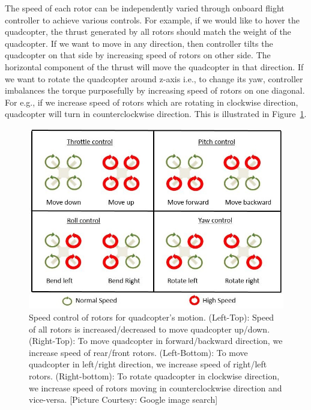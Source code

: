 The speed of each rotor can be independently varied through onboard flight
controller to achieve various controls. For example, if we would like to hover
the quadcopter, the thrust generated by all rotors should match the weight of the
quadcopter. If we want to move in any direction, then controller tilts the
quadcopter on that side by increasing speed of rotors on other side. The
horizontal component of the thrust will move the quadcopter in that direction.
If we want to rotate the quadcopter around z-axis i.e., to change its yaw,
controller imbalances the torque purposefully by increasing speed of rotors on
one diagonal. For e.g., if we increase speed of rotors which are rotating in
clockwise direction, quadcopter will turn in counterclockwise direction.
This is illustrated in Figure~\ref{fig:quadcopterMotion}.

\begin{figure}[h!]
  \includegraphics[width=\textwidth]{images/quadcopterMotion.jpg}
  \caption[Speed control of rotors for quadcopter's motion]{Speed control of
  rotors for quadcopter's motion.
  (Left-Top): Speed of all rotors is increased/decreased to move
  quadcopter up/down.
  (Right-Top): To move quadcopter in forward/backward direction, we increase
  speed of rear/front rotors.
  (Left-Bottom): To move quadcopter in left/right direction, we increase
  speed of right/left rotors.
  (Right-bottom): To rotate quadcopter in clockwise direction, we increase speed
  of rotors moving in counterclockwise direction and vice-versa. 
   [Picture Courtesy: Google image search]}
  \label{fig:quadcopterMotion}	
\end{figure}

